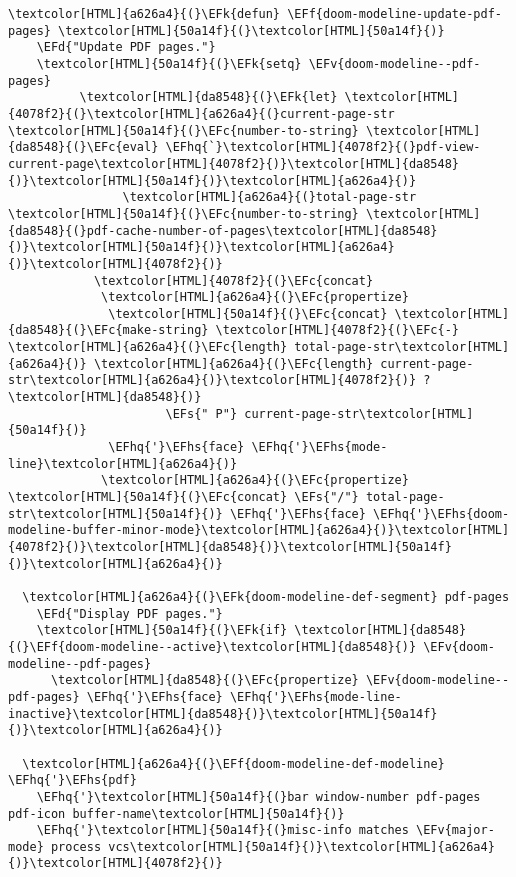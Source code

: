 \documentclass{scrartcl}
\newcommand{\EFk}[1]{\textcolor{EFk}{#1}} %
\newcommand{\EFd}[1]{\textcolor{EFd}{\textit{#1}}} %
\newcommand{\EFs}[1]{\textcolor{EFs}{#1}} %
\newcommand{\EFc}[1]{\textcolor{EFc}{#1}} %
\newcommand{\EFv}[1]{\textcolor{EFv}{#1}} %
\newcommand{\EFf}[1]{\textcolor{EFf}{#1}} %
\newcommand{\EFhq}[1]{\textcolor{EFhq}{#1}} %
\newcommand{\EFhs}[1]{\textcolor{EFhs}{#1}} %
\begin{document}
\begin{Code}
\begin{Verbatim}[]
  \textcolor[HTML]{a626a4}{(}\EFk{defun} \EFf{doom-modeline-update-pdf-pages} \textcolor[HTML]{50a14f}{(}\textcolor[HTML]{50a14f}{)}
    \EFd{"Update PDF pages."}
    \textcolor[HTML]{50a14f}{(}\EFk{setq} \EFv{doom-modeline--pdf-pages}
          \textcolor[HTML]{da8548}{(}\EFk{let} \textcolor[HTML]{4078f2}{(}\textcolor[HTML]{a626a4}{(}current-page-str \textcolor[HTML]{50a14f}{(}\EFc{number-to-string} \textcolor[HTML]{da8548}{(}\EFc{eval} \EFhq{`}\textcolor[HTML]{4078f2}{(}pdf-view-current-page\textcolor[HTML]{4078f2}{)}\textcolor[HTML]{da8548}{)}\textcolor[HTML]{50a14f}{)}\textcolor[HTML]{a626a4}{)}
                \textcolor[HTML]{a626a4}{(}total-page-str \textcolor[HTML]{50a14f}{(}\EFc{number-to-string} \textcolor[HTML]{da8548}{(}pdf-cache-number-of-pages\textcolor[HTML]{da8548}{)}\textcolor[HTML]{50a14f}{)}\textcolor[HTML]{a626a4}{)}\textcolor[HTML]{4078f2}{)}
            \textcolor[HTML]{4078f2}{(}\EFc{concat}
             \textcolor[HTML]{a626a4}{(}\EFc{propertize}
              \textcolor[HTML]{50a14f}{(}\EFc{concat} \textcolor[HTML]{da8548}{(}\EFc{make-string} \textcolor[HTML]{4078f2}{(}\EFc{-} \textcolor[HTML]{a626a4}{(}\EFc{length} total-page-str\textcolor[HTML]{a626a4}{)} \textcolor[HTML]{a626a4}{(}\EFc{length} current-page-str\textcolor[HTML]{a626a4}{)}\textcolor[HTML]{4078f2}{)} ? \textcolor[HTML]{da8548}{)}
                      \EFs{" P"} current-page-str\textcolor[HTML]{50a14f}{)}
              \EFhq{'}\EFhs{face} \EFhq{'}\EFhs{mode-line}\textcolor[HTML]{a626a4}{)}
             \textcolor[HTML]{a626a4}{(}\EFc{propertize} \textcolor[HTML]{50a14f}{(}\EFc{concat} \EFs{"/"} total-page-str\textcolor[HTML]{50a14f}{)} \EFhq{'}\EFhs{face} \EFhq{'}\EFhs{doom-modeline-buffer-minor-mode}\textcolor[HTML]{a626a4}{)}\textcolor[HTML]{4078f2}{)}\textcolor[HTML]{da8548}{)}\textcolor[HTML]{50a14f}{)}\textcolor[HTML]{a626a4}{)}

  \textcolor[HTML]{a626a4}{(}\EFk{doom-modeline-def-segment} pdf-pages
    \EFd{"Display PDF pages."}
    \textcolor[HTML]{50a14f}{(}\EFk{if} \textcolor[HTML]{da8548}{(}\EFf{doom-modeline--active}\textcolor[HTML]{da8548}{)} \EFv{doom-modeline--pdf-pages}
      \textcolor[HTML]{da8548}{(}\EFc{propertize} \EFv{doom-modeline--pdf-pages} \EFhq{'}\EFhs{face} \EFhq{'}\EFhs{mode-line-inactive}\textcolor[HTML]{da8548}{)}\textcolor[HTML]{50a14f}{)}\textcolor[HTML]{a626a4}{)}

  \textcolor[HTML]{a626a4}{(}\EFf{doom-modeline-def-modeline} \EFhq{'}\EFhs{pdf}
    \EFhq{'}\textcolor[HTML]{50a14f}{(}bar window-number pdf-pages pdf-icon buffer-name\textcolor[HTML]{50a14f}{)}
    \EFhq{'}\textcolor[HTML]{50a14f}{(}misc-info matches \EFv{major-mode} process vcs\textcolor[HTML]{50a14f}{)}\textcolor[HTML]{a626a4}{)}\textcolor[HTML]{4078f2}{)}
\end{Verbatim}
\end{Code}
\end{document}
